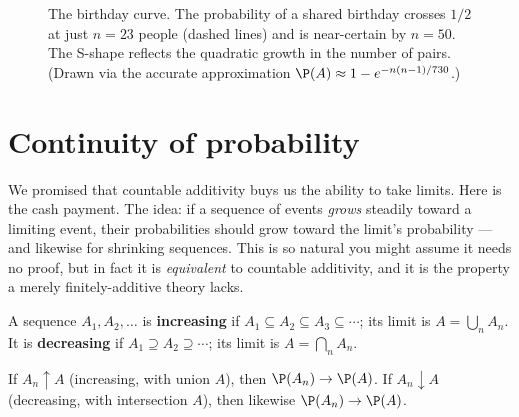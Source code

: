 \begin{figure}[H]
\centering
{}
\caption{The birthday curve. The probability of a shared birthday crosses $1/2$
at just $n=23$ people (dashed lines) and is near-certain by $n=50$. The S-shape
reflects the quadratic growth in the number of pairs. (Drawn via the accurate
approximation $\P(A)\approx 1-e^{-n(n-1)/730}$.)}
\label{ch03:fig-birthday}
\end{figure}

\section{Continuity of probability}
\label{ch03:continuity}

We promised that countable additivity buys us the ability to take limits. Here is
the cash payment. The idea: if a sequence of events \emph{grows} steadily toward
a limiting event, their probabilities should grow toward the limit's probability
--- and likewise for shrinking sequences. This is so natural you might assume it
needs no proof, but in fact it is \emph{equivalent} to countable additivity, and
it is the property a merely finitely-additive theory lacks.

\begin{definition}
\label{ch03:def-mono-seq}
A sequence $A_1, A_2, \dots$ is \textbf{increasing} if $A_1 \subseteq A_2
\subseteq A_3 \subseteq \cdots$; its limit is $A = \bigcup_{n} A_n$. It is
\textbf{decreasing} if $A_1 \supseteq A_2 \supseteq \cdots$; its limit is
$A = \bigcap_{n} A_n$.
\end{definition}

\begin{theorem}
\label{ch03:thm-continuity}
If $A_n \uparrow A$ (increasing, with union $A$), then $\P(A_n) \to \P(A)$. If
$A_n \downarrow A$ (decreasing, with intersection $A$), then likewise
$\P(A_n) \to \P(A)$.
\end{theorem}

